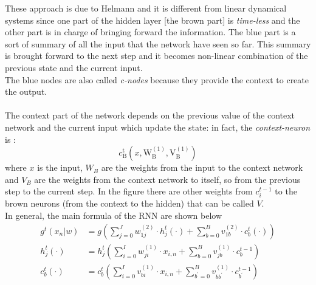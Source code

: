 These approach is due to Helmann and it is different from linear dynamical systems since one part of the hidden layer [the brown part] is \textit{time-less} and the other part is in charge of bringing forward the information. The blue part is a sort of summary of all the input that the network have seen so far. This summary is brought forward to the next step and it becomes non-linear combination of the previous state and the current input. \\
The blue nodes are also called \textit{c-nodes} because they provide the context to create the output.\\ \\
The context part of the network depends on the previous value of the context network and the current input which update the state: in fact, the \textit{context-neuron} is : 
$$
c_{\mathrm{B}}^{\mathrm{t}}\left(x, \mathrm{W}_{\mathrm{B}}^{(1)}, \mathrm{V}_{\mathrm{B}}^{(1)}\right)
$$
where $x$ is the input, $W_B$ are the weights from the input to the context network and $V_B$ are the weights from the context network to itself, so from the previous step to the current step.
In the figure there are other weights from $c_i^{t-1}$ to the brown neurons (from the context to the hidden) that can  be called $V$.\\
In general, the main formula of the RNN are shown below
$$
\begin{aligned}
g^{t}\left(x_{n} | w\right) &=g\left(\sum_{j=0}^{J} w_{1 j}^{(2)} \cdot h_{j}^{t}(\cdot)+\sum_{b=0}^{B} v_{1 b}^{(2)} \cdot c_{b}^{t}(\cdot)\right) \\
h_{j}^{t}(\cdot) &=h_{j}^{t}\left(\sum_{i=0}^{I} w_{j i}^{(1)} \cdot x_{i, n}+\sum_{b=0}^{B} v_{j b}^{(1)} \cdot c_{b}^{t-1}\right) \\
c_{b}^{t}(\cdot) &=c_{b}^{t}\left(\sum_{i=0}^{I} v_{b i}^{(1)} \cdot x_{i, n}+\sum_{b^{\prime}=0}^{B} v_{b b^{\prime}}^{(1)} \cdot c_{b^{\prime}}^{t-1}\right)
\end{aligned}
$$

